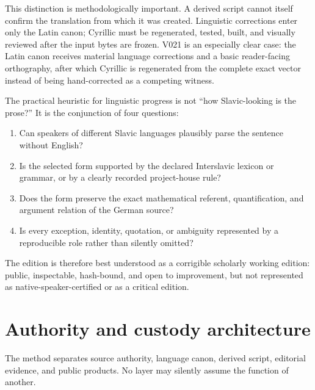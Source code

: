 \documentclass[11pt]{article}
\begin{document}
This distinction is methodologically important. A derived script cannot itself confirm the translation from which it was created. Linguistic corrections enter only the Latin canon; Cyrillic must be regenerated, tested, built, and visually reviewed after the input bytes are frozen. V021 is an especially clear case: the Latin canon receives material language corrections and a basic reader-facing orthography, after which Cyrillic is regenerated from the complete exact vector instead of being hand-corrected as a competing witness.

The practical heuristic for linguistic progress is not ``how Slavic-looking is the prose?'' It is the conjunction of four questions:

\begin{enumerate}
\item Can speakers of different Slavic languages plausibly parse the sentence without English?
\item Is the selected form supported by the declared Interslavic lexicon or grammar, or by a clearly recorded project-house rule?
\item Does the form preserve the exact mathematical referent, quantification, and argument relation of the German source?
\item Is every exception, identity, quotation, or ambiguity represented by a reproducible role rather than silently omitted?
\end{enumerate}

The edition is therefore best understood as a corrigible scholarly working edition: public, inspectable, hash-bound, and open to improvement, but not represented as native-speaker-certified or as a critical edition.

\section{Authority and custody architecture}

The method separates source authority, language canon, derived script, editorial evidence, and public products. No layer may silently assume the function of another.
\end{document}
